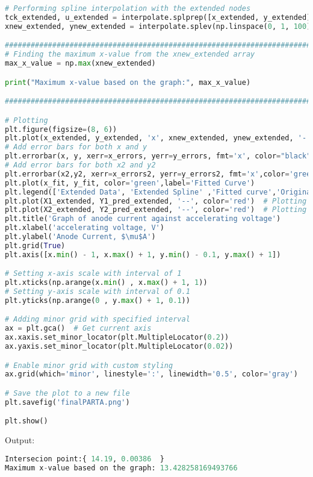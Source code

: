 \documentclass[a4paper,11pt]{article}
\begin{document}
\begin{lstlisting}[language=Python]
# Performing spline interpolation with the extended nodes
tck_extended, u_extended = interpolate.splprep([x_extended, y_extended], s=0)
xnew_extended, ynew_extended = interpolate.splev(np.linspace(0, 1, 100), tck_extended, der=0)

###############################################################################
# Finding the maximum x-value from the xnew_extended array
max_x_value = np.max(xnew_extended)

print("Maximum x-value based on the graph:", max_x_value)

################################################################################

# Plotting
plt.figure(figsize=(8, 6))
plt.plot(x_extended, y_extended, 'x', xnew_extended, ynew_extended, '-', color = "blue")
# Add error bars for both x and y
plt.errorbar(x, y, xerr=x_errors, yerr=y_errors, fmt='x', color="black", ecolor='red', elinewidth=2, capsize=4) 
# Add error bars for both x2 and y2 
plt.errorbar(x2,y2, xerr=x_errors2, yerr=y_errors2, fmt='x',color='green',ecolor='orange',elinewidth=2, capsize=4)
plt.plot(x_fit, y_fit, color='green',label='Fitted Curve')
plt.legend(['Extended Data', 'Extended Spline' ,'Fitted curve','Original Data with error bar','Data of region of interest with error bar'])
plt.plot(X1_extended, Y1_pred_extended, '--', color='red')  # Plotting the regression line 1
plt.plot(X2_extended, Y2_pred_extended, '--', color='red')  # Plotting the regression line 2
plt.title('Graph of anode current against accelerating voltage')
plt.xlabel('accelerating voltage, V')
plt.ylabel('Anode Current, $\mu$A')
plt.grid(True)
plt.axis([x.min() - 1, x.max() + 1, y.min() - 0.1, y.max() + 1])

# Setting x-axis scale with interval of 1
plt.xticks(np.arange(x.min() , x.max() + 1, 1))
# Setting y-axis scale with interval of 0.1
plt.yticks(np.arange(0 , y.max() + 1, 0.1))

# Adding minor grid with specified interval
ax = plt.gca()  # Get current axis
ax.xaxis.set_minor_locator(plt.MultipleLocator(0.2))
ax.yaxis.set_minor_locator(plt.MultipleLocator(0.02))

# Enable minor grid with custom styling
ax.grid(which='minor', linestyle=':', linewidth='0.5', color='gray')

# Save the plot to a new file
plt.savefig('finalPARTA.png')

plt.show()
\end{lstlisting}
Output:
\begin{lstlisting}[language=Python]
Intersecion point:{ 14.19, 0.00386  }
Maximum x-value based on the graph: 13.428258169493766
\end{lstlisting}
\end{document}
